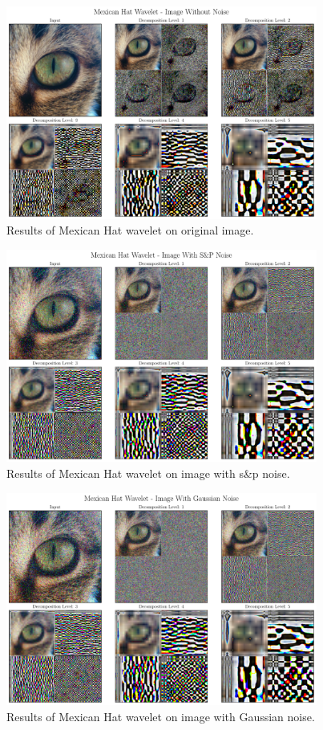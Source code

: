 \documentclass[12pt]{article}
\begin{document}
	\begin{figure}[!h]
		\centering
		\includegraphics[height=7cm]{../Tests/Outputs/2D_MexicanHatWavelet_WithoutNoise.pdf}
		\caption{Results of Mexican Hat wavelet on original image.}
		\label{fig:2d_mh}
	\end{figure}
	
	\begin{figure}[!h]
		\centering
		\includegraphics[height=7cm]{../Tests/Outputs/2D_MexicanHatWavelet_SPNoise.pdf}
		\caption{Results of Mexican Hat wavelet on image with s\&p noise.}
		\label{fig:2d_mh_sp}
	\end{figure}
	
	\begin{figure}[!h]
		\centering
		\includegraphics[height=7cm]{../Tests/Outputs/2D_MexicanHatWavelet_GaussianNoise.pdf}
		\caption{Results of Mexican Hat wavelet on image with Gaussian noise.}
		\label{fig:2d_mh_gs}
	\end{figure}
	
\end{document}
